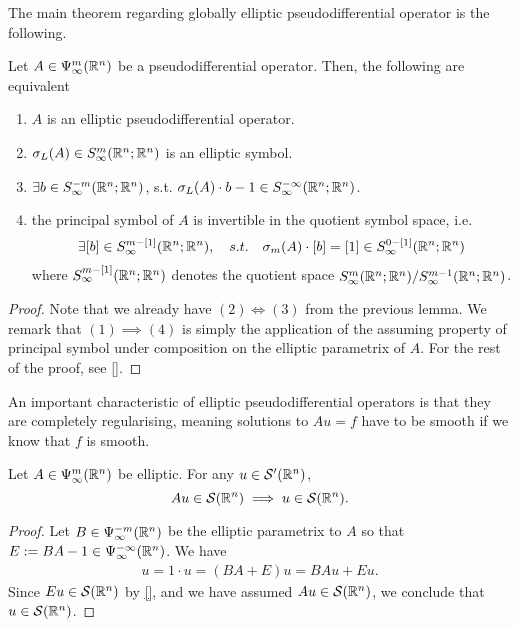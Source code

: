 \documentclass[12pt]{article}
\begin{document}
The main theorem regarding globally elliptic pseudodifferential operator is the following. 
\begin{ftheorem}
    Let $A \in \Psi^{m}_{\infty}({\mathbb R}^n)$ be a pseudodifferential operator. Then, the following are equivalent
    \begin{enumerate}
        \item $A$ is an elliptic pseudodifferential operator.
        
        \item $\sigma_L(A) \in S^{m}_\infty({\mathbb R}^{n}; {\mathbb R}^n)$ is an elliptic symbol.
                
        \item $\exists b \in S^{- m}_\infty({\mathbb R}^{n}; {\mathbb R}^n)$, s.t. $\sigma_L(A) \cdot b -1 \in S^{-\infty }_\infty({\mathbb R}^{n}; {\mathbb R}^n)$. 
        
        \item the principal symbol of $A$ is invertible in the quotient symbol space, i.e. 
        \begin{align*}
        \exists [b] \in S^{m - [1]}_\infty({\mathbb R}^{n}; {\mathbb R}^n), \quad s.t. \quad \sigma_m(A) \cdot [b] = [1] \in S^{0 - [1]}_\infty({\mathbb R}^{n}; {\mathbb R}^n)
        \end{align*}
        where $S^{m-[1]}_\infty({\mathbb R}^{n}; {\mathbb R}^n)$ denotes the quotient space $S^{m}_\infty({\mathbb R}^{n}; {\mathbb R}^n) / S^{m -1}_\infty({\mathbb R}^{n}; {\mathbb R}^n)$. 

    \end{enumerate}
\end{ftheorem}
\begin{proof}
    Note that we already have $(2) \iff (3)$ from the previous lemma. We remark that $(1) \implies (4)$ is simply the application of the assuming property of principal symbol under composition on the elliptic parametrix of $A$. For the rest of the proof, see \ref{}. 
    
\end{proof}


An important characteristic of elliptic pseudodifferential operators is that they are completely regularising, meaning solutions to $Au = f$ have to be smooth if we know that $f$ is smooth. 

\begin{fprop}
    Let $A \in \Psi^{m}_{\infty}({\mathbb R}^n)$  be  elliptic. For any $u \in \mathcal{S}'({\mathbb R}^n)$, 
    $$Au \in \mathcal{S}({\mathbb R}^n) \implies u \in \mathcal{S}({\mathbb R}^n). $$ 
\end{fprop}
\begin{proof}
    Let $B \in \Psi^{-m}_{\infty}({\mathbb R}^n)$ be the elliptic parametrix to $A$ so that $E:= BA - 1 \in \Psi^{-\infty }_{\infty}({\mathbb R}^n)$. We have
    \begin{align*}
    u = 1 \cdot u = (BA + E)u = BAu + Eu. 
    \end{align*}
    Since $Eu \in \mathcal{S}({\mathbb R}^n)$ by \ref{}, and  we have assumed $Au \in \mathcal{S}({\mathbb R}^n)$, we conclude that $u \in \mathcal{S}({\mathbb R}^n)$. 
    
\end{proof}
\end{document}
